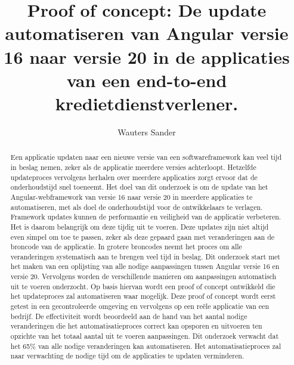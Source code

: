\documentclass{hogent-article}
\title{Proof of concept: De update automatiseren van Angular versie 16 naar versie 20 in de applicaties van een end-to-end kredietdienstverlener.}
\author{Wauters Sander}
\begin{document}
\begin{abstract}

Een applicatie updaten naar een nieuwe versie van een softwareframework kan veel tijd in beslag nemen, zeker als de applicatie meerdere versies achterloopt.
Hetzelfde updateproces vervolgens herhalen over meerdere applicaties zorgt ervoor dat de onderhoudstijd snel toeneemt.
Het doel van dit onderzoek is om de update van het Angular-webframework van versie 16 naar versie 20 in meerdere applicaties te automatiseren, met als doel de onderhoudstijd voor de ontwikkelaars te verlagen.
Framework updates kunnen de performantie en veiligheid van de applicatie verbeteren.
Het is daarom belangrijk om deze tijdig uit te voeren.
Deze updates zijn niet altijd even simpel om toe te passen, zeker als deze gepaard gaan met veranderingen aan de broncode van de applicatie.
In grotere broncodes neemt het proces om alle veranderingen systematisch aan te brengen veel tijd in beslag.
Dit onderzoek start met het maken van een oplijsting van alle nodige aanpassingen tussen Angular versie 16 en versie 20.
Vervolgens worden de verschillende manieren om aanpassingen automatisch uit te voeren onderzocht.
Op basis hiervan wordt een proof of concept ontwikkeld die het updateproces zal automatiseren waar mogelijk.
Deze proof of concept wordt eerst getest in een gecontroleerde omgeving en vervolgens op een reële applicatie van een bedrijf.
De effectiviteit wordt beoordeeld aan de hand van het aantal nodige veranderingen die het automatisatieproces correct kan opsporen en uitvoeren ten opzichte van het totaal aantal uit te voeren aanpassingen.
Dit onderzoek verwacht dat het 65\% van alle nodige veranderingen kan automatiseren.
Het automatisatieproces zal naar verwachting de nodige tijd om de applicaties te updaten verminderen.

\end{abstract}

\tableofcontents



\printbibliography[heading=bibintoc]
\end{document}

